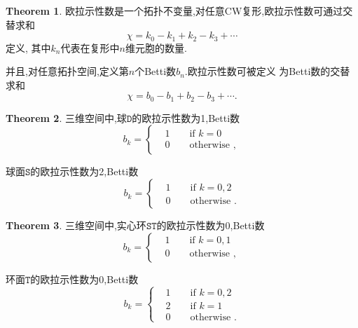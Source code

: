 \documentclass[a4paper]{book}
\numberwithin{equation}{chapter}
\theoremstyle{definition}
\newtheorem{thm}{Theorem}[chapter]
\begin{document}
\begin{thm}
    欧拉示性数是一个拓扑不变量,对任意CW复形,欧拉示性数可通过交替求和
    \begin{equation}
        \chi = k_0 - k_1 + k_2 - k_3 + \cdots 
    \end{equation} 
    定义, 其中$k_n$代表在复形中$n$维元胞的数量.
    
    并且,对任意拓扑空间,定义第$n$个Betti数$b_n$.欧拉示性数可被定义
    为Betti数的交替求和
    \begin{equation}
        \chi = b_0 - b_1 + b_2 - b_3 + \cdots.
    \end{equation}
\end{thm}

\begin{thm}
    三维空间中,球$\mathtt{D}$的欧拉示性数为1,Betti数
    \begin{equation*}
        b_k = \left\{ 
        \begin{aligned}
            &1 \qquad \text{if } k = 0 \\
            &0 \qquad \text{otherwise },
        \end{aligned}
        \right.
    \end{equation*}
    
    球面$\mathtt{S}$的欧拉示性数为2,Betti数
    \begin{equation*}
        b_k = \left\{ 
        \begin{aligned}
            &1 \qquad \text{if } k = 0,2 \\
            &0 \qquad \text{otherwise }.
        \end{aligned}
        \right.
    \end{equation*}
\end{thm}

\begin{thm}
    三维空间中,实心环$\mathtt{ST}$的欧拉示性数为0,Betti数
    \begin{equation*}
        b_k = \left\{ 
        \begin{aligned}
            &1 \qquad \text{if } k = 0,1 \\
            &0 \qquad \text{otherwise },
        \end{aligned}
        \right.
    \end{equation*}
    
    环面$\mathtt{T}$的欧拉示性数为0,Betti数
    \begin{equation*}
        b_k = \left\{ 
        \begin{aligned}
            &1 \qquad \text{if } k = 0,2 \\
            &2 \qquad \text{if } k = 1 \\
            &0 \qquad \text{otherwise }.
        \end{aligned}
        \right.
    \end{equation*}
\end{thm}
\end{document}
